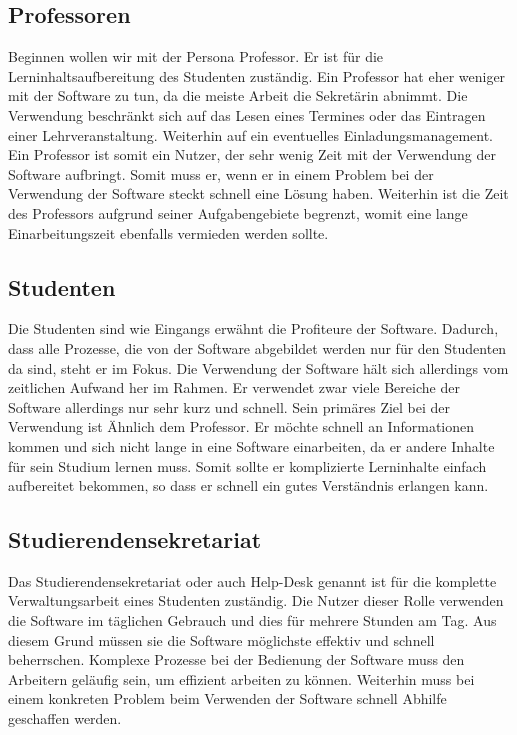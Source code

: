 \subsection{Professoren}
Beginnen wollen wir mit der Persona Professor. Er ist für die Lerninhaltsaufbereitung des Studenten zuständig. Ein Professor hat eher weniger mit der Software zu tun, da die meiste Arbeit die Sekretärin abnimmt. Die Verwendung beschränkt sich auf das Lesen eines Termines oder das Eintragen einer Lehrveranstaltung. Weiterhin auf ein eventuelles Einladungsmanagement. Ein Professor ist somit ein Nutzer, der sehr wenig Zeit mit der Verwendung der Software aufbringt. Somit muss er, wenn er in einem Problem bei der Verwendung der Software steckt schnell eine Lösung haben. Weiterhin ist die Zeit des Professors aufgrund seiner Aufgabengebiete begrenzt, womit eine lange Einarbeitungszeit ebenfalls vermieden werden sollte.

\subsection{Studenten}
Die Studenten sind wie Eingangs erwähnt die Profiteure der Software. Dadurch, dass alle Prozesse, die von der Software abgebildet werden nur für den Studenten da sind, steht er im Fokus. Die Verwendung der Software hält sich allerdings vom zeitlichen Aufwand her im Rahmen. Er verwendet zwar viele Bereiche der Software allerdings nur sehr kurz und schnell. Sein primäres Ziel bei der Verwendung ist Ähnlich dem Professor. Er möchte schnell an Informationen kommen und sich nicht lange in eine Software einarbeiten, da er andere Inhalte für sein Studium lernen muss. Somit sollte er komplizierte Lerninhalte einfach aufbereitet bekommen, so dass er schnell ein gutes Verständnis erlangen kann.

\subsection{Studierendensekretariat}
Das Studierendensekretariat oder auch Help-Desk genannt ist für die komplette Verwaltungsarbeit eines Studenten zuständig. Die Nutzer dieser Rolle verwenden die Software im täglichen Gebrauch und dies für mehrere Stunden am Tag. Aus diesem Grund müssen sie die Software möglichste effektiv und schnell beherrschen. Komplexe Prozesse bei der Bedienung der Software muss den Arbeitern geläufig sein, um effizient arbeiten zu können. Weiterhin muss bei einem konkreten Problem beim Verwenden der Software schnell Abhilfe geschaffen werden. 

